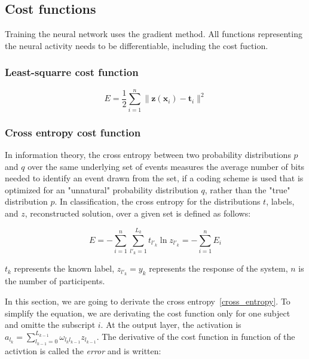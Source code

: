 \documentclass[final, paper=letter,5p,times,twocolumn]{elsarticle}
\begin{document}
\subsection{Cost functions}

Training the neural network uses the gradient method. All functions representing the neural activity needs to be differentiable, including the cost fuction.

\subsubsection{Least-squarre cost function}

\begin{equation}
  E = \frac{1}{2} \sum_{i = 1}^{n} \| \bm{z}(\bm{x}_{i}) - \bm{t}_{i} \|^{2}
  \label{least_squarre}
\end{equation}

\subsubsection{Cross entropy cost function}
\label{Cross_entropy_cost_function_sec}

In information theory, the cross entropy between two probability distributions $p$ and $q$ over the same underlying set of events measures the average number of bits needed to identify an event drawn from the set, if a coding scheme is used that is optimized for an "unnatural" probability distribution $q$, rather than the "true" distribution $p$. In classification, the cross entropy for the distributions $t$, labels, and $z$, reconstructed solution, over a given set is defined as follows:

\begin{equation}
  E = - \sum_{i = 1}^{n}\sum_{l'_{k} = 1}^{L_{k}} t_{l'_{k}} \ln z_{l'_{k}} =  - \sum_{i = 1}^{n} E_{i}
  \label{cross_entropy}
\end{equation}

$t_{k}$ represents the known label, $z_{l'_{k}} = y_{k}$ represents the response of the system, $n$ is the number of participents. 

In this section, we are going to derivate the cross entropy~\ref{cross_entropy}. To simplify the equation, we are derivating the cost function only for one subject and omitte the subscript $i$. At the output layer, the activation is $a_{l_{k}} = \sum_{l_{k-1} = 0}^{L_{k-1}} \omega_{l_{k}l_{k-1}} z_{l_{k-1}}$. The derivative of the cost function in function of the activtion is called the {\it error} and is written:
\end{document}
